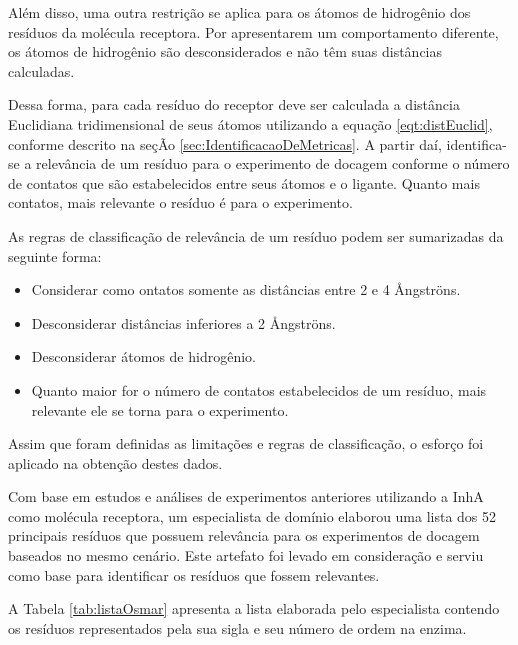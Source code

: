 Além disso, uma outra restrição se aplica para os átomos de hidrogênio dos resíduos da molécula receptora. Por apresentarem um comportamento diferente, os átomos de hidrogênio são desconsiderados e não têm suas distâncias calculadas.

Dessa forma, para cada resíduo do receptor deve ser calculada a distância Euclidiana tridimensional de seus átomos utilizando a equação \ref{eqt:distEuclid}, conforme descrito na seçÃo \ref{sec:IdentificacaoDeMetricas}. A partir daí, identifica-se a relevância de um resíduo para o experimento de docagem conforme o número de contatos que são estabelecidos entre seus átomos e o ligante. Quanto mais contatos, mais relevante o resíduo é para o experimento.

As regras de classificação de relevância de um resíduo podem ser sumarizadas da seguinte forma:
\begin{itemize}
	\item Considerar como ontatos somente as distâncias entre 2 e 4 {\AA}ngstr\"ons.
	\item Desconsiderar distâncias inferiores a 2 {\AA}ngstr\"ons.
	\item Desconsiderar átomos de hidrogênio.
	\item Quanto maior for o número de contatos estabelecidos de um resíduo, mais relevante ele se torna para o experimento.
\end{itemize}

Assim que foram definidas as limitações e regras de classificação, o esforço foi aplicado na obtenção destes dados. 

Com base em estudos e análises de experimentos anteriores utilizando a InhA como molécula receptora, um especialista de domínio elaborou uma lista dos 52 principais resíduos que possuem relevância para os experimentos de docagem baseados no mesmo cenário. Este artefato foi levado em consideração e serviu como base para identificar os resíduos que fossem relevantes. 

A Tabela \ref{tab:listaOsmar} apresenta a lista elaborada pelo especialista contendo os resíduos representados pela sua sigla e seu número de ordem na enzima.

